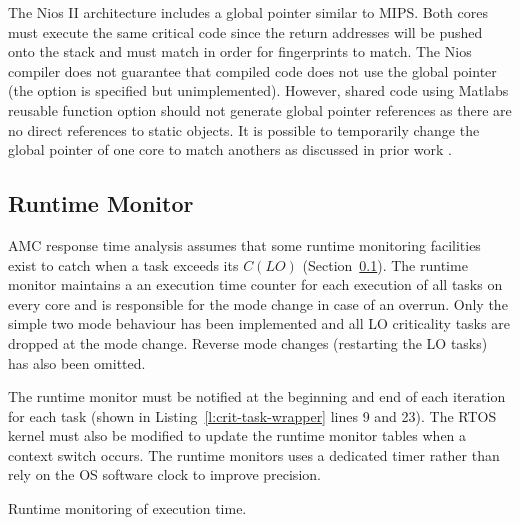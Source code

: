 The Nios II architecture includes a global pointer similar to MIPS. Both cores must execute the same critical code since the return addresses will be pushed onto the stack and must match in order for fingerprints to match. The Nios compiler does not guarantee that compiled code does not use the global pointer (the option is specified but unimplemented). However, shared code using Matlabs reusable function option should not generate global pointer references as there are no direct references to static objects. It is possible to temporarily change the global pointer of one core to match anothers as discussed in prior work \cite{ugthesis}.


\subsection{Runtime Monitor}

AMC response time analysis assumes that some runtime monitoring facilities exist to catch when a task exceeds its $C(LO)$ (Section~\ref{}). The runtime monitor maintains a an execution time counter for each execution of all tasks on every core and is responsible for the mode change in case of an overrun. Only the simple two mode behaviour has been implemented and all LO criticality tasks are dropped at the mode change. Reverse mode changes (restarting the LO tasks) has also been omitted.

The runtime monitor must be notified at the beginning and end of each iteration for each task (shown in Listing~\ref{l:crit-task-wrapper} lines 9 and 23). The RTOS kernel must also be modified to update the runtime monitor tables when a context switch occurs. The runtime monitors uses a dedicated timer rather than rely on the OS software clock to improve precision.

\begin{algorithm}
\DontPrintSemicolon
	\caption{Runtime monitoring of execution time.}
	\label{a:run-mon}
\end{algorithm}
 


